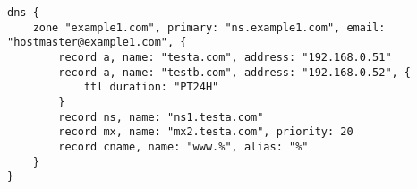 \begin{lstlisting}[style=Java]
dns {
    zone "example1.com", primary: "ns.example1.com", email: "hostmaster@example1.com", {
        record a, name: "testa.com", address: "192.168.0.51"
        record a, name: "testb.com", address: "192.168.0.52", { 
            ttl duration: "PT24H" 
        }
        record ns, name: "ns1.testa.com"
        record mx, name: "mx2.testa.com", priority: 20
        record cname, name: "www.%", alias: "%"
    }
}
\end{lstlisting}

